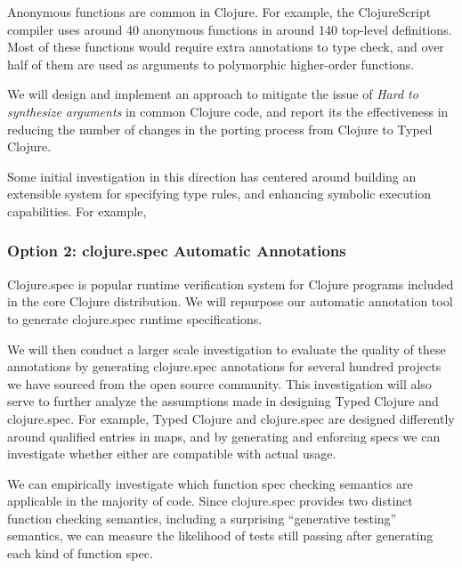\documentclass[9pt]{extarticle}
\begin{document}
Anonymous functions are common in Clojure. For example, the ClojureScript compiler
uses around 40 anonymous functions in around 140 top-level definitions.
Most of these functions would require extra annotations to type check, and
over half of them are used as arguments to polymorphic higher-order functions.

We will design and implement an approach to mitigate the issue of \emph{Hard
to synthesize arguments} in common Clojure code, and report its the effectiveness
in reducing the number of changes in the porting process from Clojure to
Typed Clojure.

Some initial investigation in this direction has centered around building
an extensible system for specifying type rules, and enhancing symbolic
execution capabilities. For example, 







\subsubsection{Option 2: clojure.spec Automatic Annotations}

Clojure.spec is popular runtime verification system for Clojure programs included
in the core Clojure distribution.
We will repurpose our automatic annotation
tool to generate clojure.spec runtime specifications.

We will then conduct a larger scale investigation to evaluate the quality 
of these annotations by generating clojure.spec annotations for several hundred
projects we have sourced from the open source community.
This investigation will also serve to further analyze the assumptions made 
in designing Typed Clojure and clojure.spec.
For example, Typed Clojure and clojure.spec are designed differently
around qualified entries in maps, and by generating and enforcing specs
we can investigate whether either are compatible with actual usage.

We can empirically investigate which function spec checking semantics are 
applicable in the majority of code. Since clojure.spec provides
two distinct function checking semantics, including a surprising
``generative testing'' semantics, we can measure the likelihood
of tests still passing after generating each kind of function spec.
\end{document}
